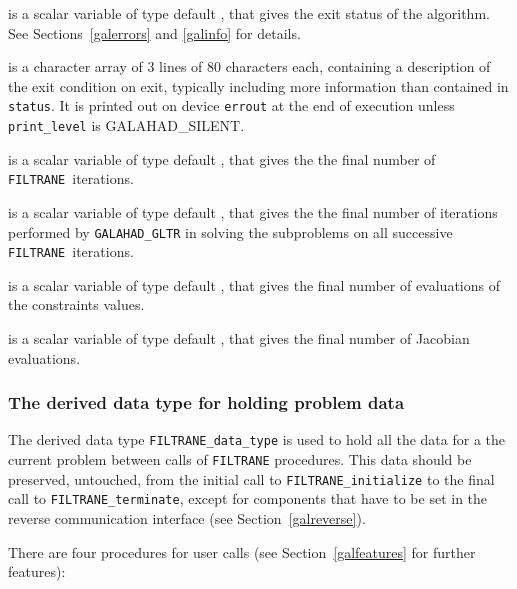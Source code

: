 \documentclass{galahad}
\newcommand{\packagename}{FILTRANE}
\newcommand{\sym}{\sf\small}
\newcommand{\filtrane}{{\tt \packagename}}
\begin{document}
\begin{description}

 is a scalar variable of type default \integer, that gives the
exit status of the algorithm. See Sections~\ref{galerrors} and \ref{galinfo}
for details.

 is a character array of 3 lines of 80 characters each,
containing a description of the exit condition
on exit, typically including more information
than contained in {\tt status}.
It is printed out on device {\tt errout} at the end of execution
unless {\tt print\_level} is {\sym GALAHAD\_SILENT}.

 is a scalar variable of type default \integer, that
gives the the final number of \filtrane\ iterations.

 is a scalar variable of type default \integer, that
gives the the final number of iterations performed by {\tt GALAHAD\_GLTR} in
solving the subproblems on all successive \filtrane\ iterations.

 is a scalar variable of type default \integer, that
gives the final number of evaluations of the constraints values.

 is a scalar variable of type default \integer, that
gives the final number of Jacobian evaluations.
\end{description}


\subsubsection{The derived data type for holding problem data}\label{typedata}
The derived data type
{\tt \packagename\_data\_type}
is used to hold all the data for a the current problem between calls of
{\tt \packagename} procedures.
This data should be preserved, untouched, from the initial call to
{\tt \packagename\_initialize}
to the final call to
{\tt \packagename\_terminate}, except for components that have to be set in
the reverse communication interface (see Section~\ref{galreverse}).


\galarguments
There are four procedures for user calls
(see Section~\ref{galfeatures} for further features):
\end{document}
